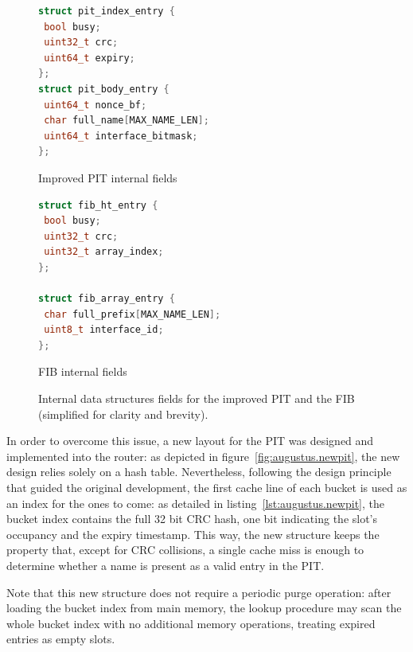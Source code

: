 \documentclass[11pt,a4paper,twoside,titlepage,openany]{book}
\begin{document}
\begin{figure}[tb]
  \captionsetup{type=lstlisting}
  \begin{sublstlisting}[t]{.5\linewidth}
  \begin{lstlisting}[language=c]
struct pit_index_entry {
 bool busy;
 uint32_t crc;
 uint64_t expiry;
};
struct pit_body_entry {
 uint64_t nonce_bf;
 char full_name[MAX_NAME_LEN];
 uint64_t interface_bitmask;
};
    \end{lstlisting}
    \caption{Improved PIT internal fields}\label{lst:augustus.newpit}
  \end{sublstlisting}%
  \begin{sublstlisting}[t]{.5\linewidth}
  \begin{lstlisting}[language=c]
struct fib_ht_entry {
 bool busy;
 uint32_t crc;
 uint32_t array_index;
};

struct fib_array_entry {
 char full_prefix[MAX_NAME_LEN];
 uint8_t interface_id;
};
    \end{lstlisting}
    \caption{FIB internal fields}\label{lst:augustus.fib}
  \end{sublstlisting}
  \caption[Internal data structures fields for the improved PIT and the FIB]{Internal data structures fields for the improved PIT and the FIB (simplified for clarity and brevity).}\label{lst:augustus.newpit_fib}
\end{figure}

In order to overcome this issue, a new layout for the PIT was designed and implemented into the router: as depicted in figure~\ref{fig:augustus.newpit}, the new design relies solely on a hash table. Nevertheless, following the design principle that guided the original development, the first cache line of each bucket is used as an index for the ones to come: as detailed in listing~\ref{lst:augustus.newpit}, the bucket index contains the full 32 bit CRC hash, one bit indicating the slot's occupancy and the expiry timestamp. This way, the new structure keeps the property that, except for CRC collisions, a single cache miss is enough to determine whether a name is present as a valid entry in the PIT.

Note that this new structure does not require a periodic purge operation: after loading the bucket index from main memory, the lookup procedure may scan the whole bucket index with no additional memory operations, treating expired entries as empty slots.
\end{document}
